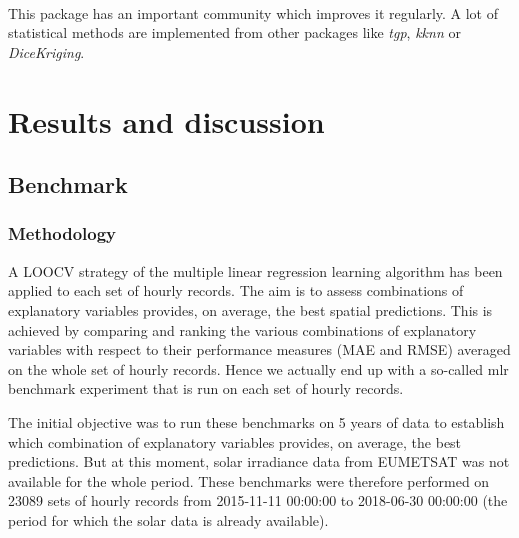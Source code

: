 \documentclass[12pt,twoside]{reedthesis}
\theoremstyle{definition}
\theoremstyle{definition}
\theoremstyle{definition}
\theoremstyle{remark}
\begin{document}
~

This package has an important community which improves it regularly. A
lot of statistical methods are implemented from other packages like
\emph{tgp}, \emph{kknn} or \emph{DiceKriging}.

\chapter{Results and discussion}\label{results}

\section{Benchmark}\label{benchmark}

\subsection{Methodology}\label{methodology}

A LOOCV strategy of the multiple linear regression learning algorithm
has been applied to each set of hourly records. The aim is to assess
combinations of explanatory variables provides, on average, the best
spatial predictions. This is achieved by comparing and ranking the
various combinations of explanatory variables with respect to their
performance measures (MAE and RMSE) averaged on the whole set of hourly
records. Hence we actually end up with a so-called mlr benchmark
experiment that is run on each set of hourly records.

The initial objective was to run these benchmarks on 5 years of data to
establish which combination of explanatory variables provides, on
average, the best predictions. But at this moment, solar irradiance data
from EUMETSAT was not available for the whole period. These benchmarks
were therefore performed on 23089 sets of hourly records from 2015-11-11
00:00:00 to 2018-06-30 00:00:00 (the period for which the solar data is
already available).

~
\end{document}
